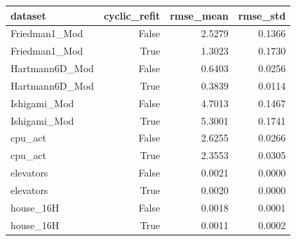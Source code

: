 \begin{tabular}{lrrr}
\toprule
dataset & cyclic_refit & rmse_mean & rmse_std \\
\midrule
Friedman1_Mod & False & 2.5279 & 0.1366 \\
Friedman1_Mod & True & 1.3023 & 0.1730 \\
Hartmann6D_Mod & False & 0.6403 & 0.0256 \\
Hartmann6D_Mod & True & 0.3839 & 0.0114 \\
Ishigami_Mod & False & 4.7013 & 0.1467 \\
Ishigami_Mod & True & 5.3001 & 0.1741 \\
cpu_act & False & 2.6255 & 0.0266 \\
cpu_act & True & 2.3553 & 0.0305 \\
elevators & False & 0.0021 & 0.0000 \\
elevators & True & 0.0020 & 0.0000 \\
house_16H & False & 0.0018 & 0.0001 \\
house_16H & True & 0.0011 & 0.0002 \\
\bottomrule
\end{tabular}
